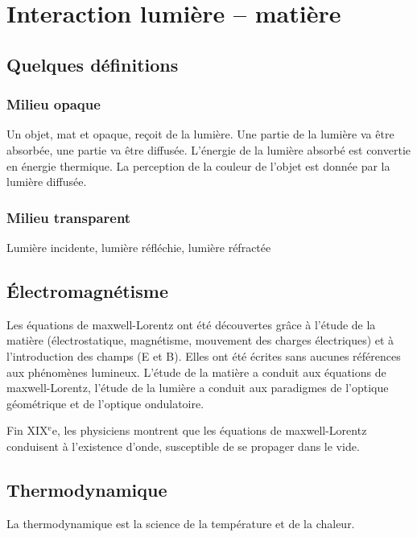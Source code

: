 \chapter{Interaction lumière -- matière}

\section{Quelques définitions}
\subsection{Milieu opaque}
Un objet, mat et opaque, reçoit de la lumière. Une partie de la lumière va être absorbée, une partie va être  diffusée. L'énergie de la lumière absorbé est convertie en énergie thermique. La perception de la couleur de l'objet est donnée par la lumière diffusée.



\subsection{Milieu transparent}
Lumière incidente, lumière réfléchie, lumière réfractée

\subsection{}

\section{Électromagnétisme}
Les équations de maxwell-Lorentz ont été découvertes grâce à l'étude de la matière (électrostatique, magnétisme, mouvement des charges électriques) et à l'introduction des champs (E et B). Elles ont été écrites sans aucunes références aux phénomènes lumineux. L'étude de la matière a conduit aux équations de maxwell-Lorentz, l'étude de la lumière a conduit aux paradigmes de l'optique géométrique et de l'optique ondulatoire.

Fin {\footnotesize XIX}$^\text{e}$e, les physiciens montrent que les équations de maxwell-Lorentz conduisent à l'existence d'onde, susceptible de se propager dans le vide. 
\begin{center}
\end{center}

\section{Thermodynamique}
La thermodynamique est la science de la température et de la chaleur.

